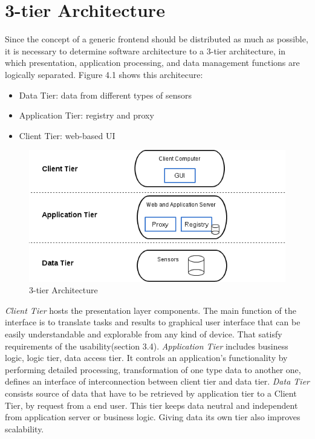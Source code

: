 \section{3-tier Architecture}
Since the concept of a generic frontend should be distributed as much as possible, it is necessary to determine software architecture 
to a 3-tier architecture, in which presentation, application processing, and data management functions are logically separated.
Figure 4.1 shows this architecure:
\begin{itemize}
\item Data Tier: data from different types of sensors
\item Application Tier: registry and proxy
\item Client Tier: web-based UI
\end{itemize} 
\begin{figure}[!ht]
\centering
\includegraphics[scale=0.7]{images/3tier.png}   
\caption[3-tier Architecture]{3-tier Architecture}
\label{img:3-tier Architecture}                           
\end{figure}
\emph{Client Tier} hosts the presentation layer components. The main function of the interface is to translate tasks and results to graphical user interface that can be easily understandable and explorable from any kind of device. That satisfy requirements of the usability(section 3.4).
\newline
\emph{Application Tier} includes business logic, logic tier, data access tier. It controls an application's functionality by performing detailed processing, transformation of one type data to another one, defines an interface of interconnection between client tier and data tier.
\newline
\emph{Data Tier} consists source of data that have to be retrieved by application tier to a Client Tier, by request from a end user. This tier keeps data neutral and independent from application server or business logic. Giving data its own tier also improves scalability. 
